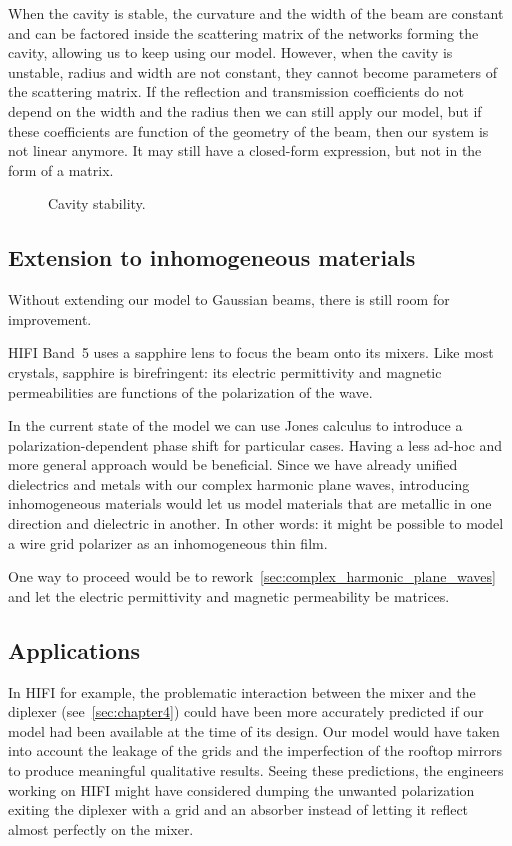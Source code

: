 When the cavity is stable, the curvature and the width of the beam are constant and can be factored inside the scattering matrix of the networks forming the cavity, allowing us to keep using our model.
However, when the cavity is unstable, radius and width are not constant, they cannot become parameters of the scattering matrix.
If the reflection and transmission coefficients do not depend on the width and the radius then we can still apply our model, but if these coefficients are function of the geometry of the beam, then our system is not linear anymore.
It may still have a closed-form expression, but not in the form of a matrix.

\begin{figure}[b]
    \centering
    \footnotesize
    
    \caption{Cavity stability.}
    \label{fig:cavity_stability}
\end{figure}

\subsection{Extension to inhomogeneous materials}
Without extending our model to Gaussian beams, there is still room for improvement.

HIFI Band~5 uses a sapphire lens to focus the beam onto its mixers.
Like most crystals, sapphire is birefringent: its electric permittivity and magnetic permeabilities are functions of the polarization of the wave.

In the current state of the model we can use Jones calculus to introduce a polarization-dependent phase shift for particular cases.
Having a less ad-hoc and more general approach would be beneficial.
Since we have already unified dielectrics and metals with our complex harmonic plane waves, introducing inhomogeneous materials would let us model materials that are metallic in one direction and dielectric in another.
In other words: it might be possible to model a wire grid polarizer as an inhomogeneous thin film.

One way to proceed would be to rework~\cref{sec:complex_harmonic_plane_waves} and let the electric permittivity and magnetic permeability be matrices.



\subsection{Applications}
In HIFI for example, the problematic interaction between the mixer and the diplexer (see~\cref{sec:chapter4}) could have been more accurately predicted if our model had been available at the time of its design.
Our model would have taken into account the leakage of the grids and the imperfection of the rooftop mirrors to produce meaningful qualitative results.
Seeing these predictions, the engineers working on HIFI might have considered dumping the unwanted polarization exiting the diplexer with a grid and an absorber instead of letting it reflect almost perfectly on the mixer.

